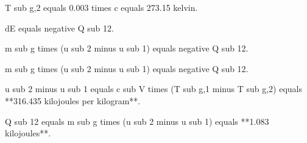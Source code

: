 T sub g,2 equals 0.003 times c equals 273.15 kelvin.  

dE equals negative Q sub 12.  

m sub g times (u sub 2 minus u sub 1) equals negative Q sub 12.  

m sub g times (u sub 2 minus u sub 1) equals negative Q sub 12.  

u sub 2 minus u sub 1 equals c sub V times (T sub g,1 minus T sub g,2) equals **316.435 kilojoules per kilogram**.  

Q sub 12 equals m sub g times (u sub 2 minus u sub 1) equals **1.083 kilojoules**.
